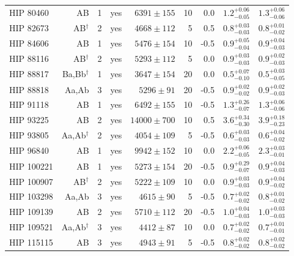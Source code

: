 \begin{scriptsize}
\begin{longtable}{|l|rrlrrrll|}
  HIP 80460 & AB &     1 & yes &  $6391 \pm 155$ &      10 &     0.0  &  $1.2^{+0.06}_{-0.05}$ &  $1.3^{+0.06}_{-0.06}$ \\
  HIP 82673 & AB$^{\dagger}$ &     2 & yes &  $4668 \pm 112$ &       5 &     0.5  &  $0.8^{+0.03}_{-0.03}$ &  $0.8^{+0.01}_{-0.02}$ \\
  HIP 84606 & AB &     1 & yes &  $5476 \pm 154$ &      10 &    -0.5 &  $0.9^{+0.05}_{-0.04}$ &  $0.9^{+0.04}_{-0.03}$ \\
  HIP 88116 & AB$^{\dagger}$ &     2 & yes &  $5293 \pm 112$ &       5 &     0.0  &  $0.9^{+0.03}_{-0.03}$ &  $0.9^{+0.02}_{-0.03}$ \\
  HIP 88817 & Ba,Bb$^{\dagger}$ &     1 & yes &  $3647 \pm 154$ &      20 &     0.0  &  $0.5^{+0.07}_{-0.10}$ &  $0.5^{+0.03}_{-0.05}$ \\
  HIP 88818 & Aa,Ab &     3 & yes &   $5296 \pm 91$ &      20 &    -0.5 &  $0.9^{+0.02}_{-0.02}$ &  $0.9^{+0.02}_{-0.03}$ \\
  HIP 91118 & AB &     1 & yes &  $6492 \pm 155$ &      10 &    -0.5  &  $1.3^{+0.26}_{-0.07}$ &  $1.3^{+0.06}_{-0.06}$ \\
  HIP 93225 & AB &     2 & yes &   $14000 \pm 700$ &     10 &     0.5 &  $3.6^{+0.34}_{-0.30}$ &  $3.9^{+0.18}_{-0.23}$ \\
  HIP 93805 & Aa,Ab$^{\dagger}$ &     2 & yes &  $4054 \pm 109$ &       5 &    -0.5  &  $0.6^{+0.03}_{-0.03}$ &  $0.6^{+0.04}_{-0.02}$ \\
  HIP 96840 & AB &     1 & yes &  $9942 \pm 152$ &      10 &     0.0  &    $2.2^{+0.06}_{-0.05}$ &  $2.3^{+0.03}_{-0.01}$ \\
 HIP 100221 & AB &     1 & yes &  $5273 \pm 154$ &      20 &    -0.5  &  $0.9^{+0.29}_{-0.07}$ &  $0.9^{+0.04}_{-0.03}$ \\
 HIP 100907 & AB$^{\dagger}$ &     2 & yes &  $5222 \pm 109$ &      10 &     0.0  &  $0.9^{+0.03}_{-0.03}$ &  $0.9^{+0.04}_{-0.02}$ \\
 HIP 103298 & Aa,Ab &     3 & yes &   $4615 \pm 90$ &       5 &    -0.5  &  $0.7^{+0.02}_{-0.02}$ &  $0.8^{+0.01}_{-0.02}$ \\
 HIP 109139 & AB &     2 & yes &  $5710 \pm 112$ &      20 &    -0.5  &  $1.0^{+0.04}_{-0.03}$ &  $1.0^{+0.03}_{-0.03}$ \\
 HIP 109521 & Aa,Ab$^{\dagger}$ &     3 & yes &   $4412 \pm 87$ &      10 &     0.0  &  $0.7^{+0.02}_{-0.02}$ &  $0.7^{+0.01}_{-0.01}$ \\
 HIP 115115 & AB &     3 & yes &   $4943 \pm 91$ &       5 &    -0.5  &  $0.8^{+0.02}_{-0.02}$ &  $0.8^{+0.02}_{-0.02}$ 
 
\end{longtable}
\end{scriptsize}


